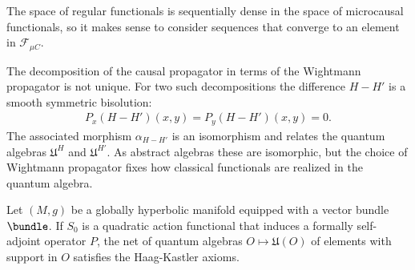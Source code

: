     The space of regular functionals is sequentially dense in the space of microcausal functionals, so it makes sense to consider sequences that converge to an element in $\mathcal{F}_{\mu C}$.
    \begin{remark}
        The decomposition of the causal propagator in terms of the Wightmann propagator is not unique. For two such decompositions the difference $H-H'$ is a smooth symmetric bisolution:
        \begin{gather}
            P_x(H-H')(x,y) = P_y(H-H')(x,y)=0.
        \end{gather}
        The associated morphism $\alpha_{H-H'}$ is an isomorphism and relates the quantum algebras $\mathfrak{U}^H$ and $\mathfrak{U}^{H'}$. As abstract algebras these are isomorphic, but the choice of Wightmann propagator fixes how classical functionals are realized in the quantum algebra.
    \end{remark}

    \begin{property}
        Let $(M,g)$ be a globally hyperbolic manifold equipped with a vector bundle $\bundle$. If $S_0$ is a quadratic action functional that induces a formally self-adjoint operator $P$, the net of quantum algebras $O\mapsto\mathfrak{U}(O)$ of elements with support in $O$ satisfies the Haag-Kastler axioms.
    \end{property}

